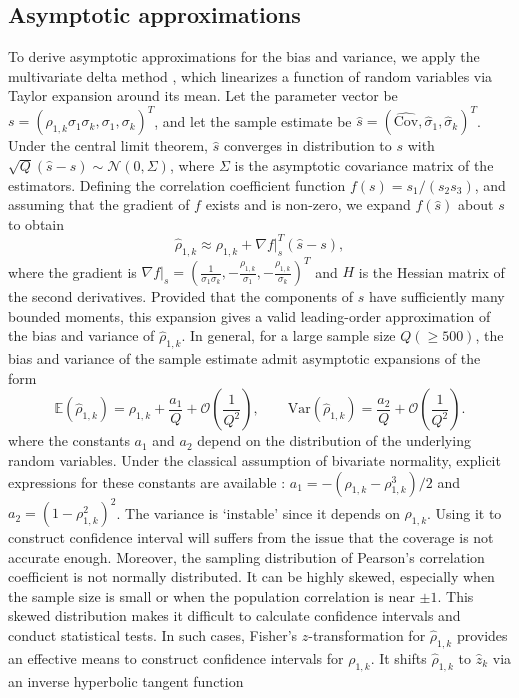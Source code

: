 \subsection{Asymptotic approximations}
To derive asymptotic approximations for the bias and variance, we apply the multivariate delta method \cite{Cr:1946,Oe:1992}, which linearizes a function of random variables via Taylor expansion around its mean. Let the parameter vector be $s = (\rho_{1,k}\sigma_1\sigma_k, \sigma_1, \sigma_k)^T$, and let the sample estimate be $\widehat s = (\widehat{\text{Cov}}, \widehat\sigma_1, \widehat\sigma_k)^T$. Under the central limit theorem, $\widehat s$ converges in distribution to $s$ with $\sqrt{Q}(\widehat s-s)\sim \mathcal{N}(0,\Sigma)$, where $\Sigma$ is the asymptotic covariance matrix of the estimators. Defining the correlation coefficient function $f(s) = s_1 / (s_2 s_3)$, and assuming that the gradient of $f$ exists and is non-zero, we expand $f(\widehat s)$ about $s$ to obtain
%
\begin{equation}
\label{eq:Correlated_Coeff_approx}
  \widehat\rho_{1,k} \approx \rho_{1,k} + \nabla f |_{s}^T \left(\widehat s-s\right), 
\end{equation}
%
where the gradient is $\nabla f|_{s} = (\frac{1}{\sigma_1\sigma_k},-\frac{\rho_{1,k}}{\sigma_1},-\frac{\rho_{1,k}}{\sigma_k} )^T$ and $H$ is the Hessian matrix of the second derivatives. Provided that the components of $\widehat s$ have sufficiently many bounded moments, this expansion gives a valid leading-order approximation of the bias and variance of $\widehat \rho_{1,k}$. In general, for a large sample size $Q (\ge 500)$,  the bias and variance of the sample estimate admit asymptotic expansions of the form
%
\begin{equation*}
\label{eq:Expectation_var_rho}
    \mathbb{E}\left(\widehat \rho_{1,k}\right) =\rho_{1,k}+\frac{a_1}{Q} + \mathcal{O}\left(\frac 1 {Q^2}\right),\qquad \text{Var}\left(\widehat \rho_{1,k}\right)= \frac{a_2}{Q} + \mathcal{O}\left(\frac{1}{Q^2}\right).
\end{equation*}
%
where the constants $a_1$ and $a_2$ depend on the distribution of the underlying random variables. Under the classical assumption of bivariate normality, explicit expressions for these constants are available \cite{Fi:1915, Ha:2007, Ri:1932, So:1913}: $a_1 = -(\rho_{1,k} - \rho_{1,k}^3)/2$ and $a_2 = (1 - \rho_{1,k}^2)^2$. The variance is `instable' since it depends on $\rho_{1,k}$. Using it to construct confidence interval will suffers from the issue that the coverage is not accurate enough. Moreover, the sampling distribution of Pearson's correlation coefficient is not normally distributed. It can be highly skewed, especially when the sample size is small or when the population correlation is near $\pm 1$. This skewed distribution makes it difficult to calculate confidence intervals and conduct statistical tests. In such cases, Fisher's $z$-transformation \cite{Fi:1915, Fi:1921} for $\widehat \rho_{1,k}$ provides an effective means to construct confidence intervals for $\rho_{1,k}$. It shifts $\widehat\rho_{1,k}$ to $\widehat z_k$ via an inverse hyperbolic tangent function
